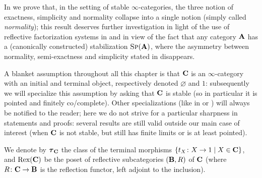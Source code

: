 In  we prove that, in the setting of stable $\infty$\hyp{}categories, the three notion of exactness, simplicity and normality collapse into a single notion (simply called \emph{normality}); this result deserves further investigation in light of the use of reflective factorization systems in \cite{BoJa} and in view of the fact that any category $\textbf{A}$ has a (canonically constructed) stabilization $\text{\scshape Sp}(\textbf{A})$, where the asymmetry between normality, semi\hyp{}exactness and simplicity stated in \cite[\S\textbf{4.4}]{CHK} disappears.
\begin{notat}
A blanket assumption throughout all this chapter is that $\textbf{C}$ is an $\infty$\hyp{}category with an initial and terminal object, respectively denoted $\varnothing$ and $1$: subsequently we will specialize this assumption by asking that $\textbf{C}$ is stable (so in particular it is pointed and finitely co\fshyp{}complete). Other specializations (like in \adef {} or ) will always be notified to the reader; here we do not strive for a particular sharpness in statements and proofs: several results are still valid outside our main case of interest (\ie when $\textbf{C}$ is not stable, but still has finite limits or is at least pointed).

We denote by $\boldsymbol{\tau}_{\textbf{C}}$ the class of the terminal morphisms $\{t_X\colon X\to 1\mid X\in\textbf{C}\}$, and $\text{Rex}(\textbf{C})$ be the poset of reflective subcategories $(\textbf{B}, R)$ of $\textbf{C}$ (where $R\colon \textbf{C} \to \textbf{B}$ is the reflection functor, left adjoint to the inclusion).
\end{notat}
